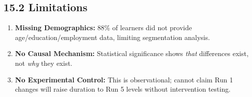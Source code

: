 \documentclass[
]{article}
\providecommand{\tightlist}{%
  \setlength{\itemsep}{0pt}\setlength{\parskip}{0pt}}
\begin{document}
\subsection{15.2 Limitations}\label{limitations}

\begin{enumerate}
\def\labelenumi{\arabic{enumi}.}
\tightlist
\item
  \textbf{Missing Demographics:} 88\% of learners did not provide
  age/education/employment data, limiting segmentation analysis.\\
\item
  \textbf{No Causal Mechanism:} Statistical significance shows
  \emph{that} differences exist, not \emph{why} they exist.\\
\item
  \textbf{No Experimental Control:} This is observational; cannot claim
  Run 1 changes will raise duration to Run 5 levels without intervention
  testing.
\end{enumerate}
\end{document}
